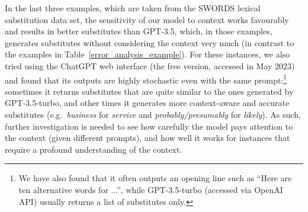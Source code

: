 \documentclass[11pt]{article}
\newcommand{\tabref}[2][]{Table#1~\ref{#2}\xspace}
\newcommand{\ex}[1]{\textit{#1}\xspace}
\begin{document}
In the last three examples, which are taken from the SWORDS lexical substitution data set, the sensitivity of our model to context works favourably and results in better substitutes than GPT-3.5, which, in those examples, generates substitutes without considering the context very much (in contrast to the examples in \tabref{error_analysis_example}). For these instances, we also tried using the ChatGPT web interface (the free version, accessed in May 2023) and found that its outputs are highly stochastic even with the same prompt:\footnote{We have also found that it often outputs an opening line such as ``Here are ten alternative words for ...'', while GPT-3.5-turbo (accessed via OpenAI API) usually returns a list of substitutes only.} sometimes it returns substitutes that are quite similar to the ones generated by GPT-3.5-turbo, and other times it generates more context-aware and accurate substitutes (e.g.\ \ex{business} for \ex{service} and \ex{probably/presumably} for \ex{likely}). As such, further investigation is needed to see how carefully the model pays attention to the context (given different prompts), and how well it works for instances that require a profound understanding of the context. 

\label{error_analysis}
\end{document}

